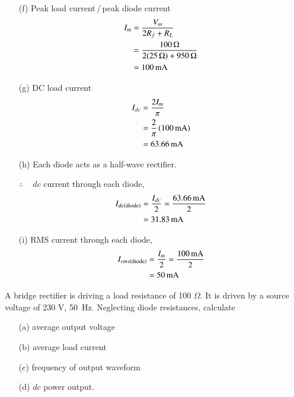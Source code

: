 \begin{solution}
\begin{itemize}
\item[(f)] Peak load current\,/\,peak diode current
\begin{align*}
I_m & = \frac{V_m}{2 R_f + R_L}\\
& = \frac{100\,\Omega}{2(25\,\Omega) + 950\,\Omega }\\
& = 100 \operatorname{mA}
\end{align*}

\item[(g)] DC load current
\begin{align*}
I_{dc} & = \frac{2I_m}{\pi}\\
& = \frac{2}{\pi}\, (100 \operatorname{mA})\\
& = 63.66 \operatorname{mA}
\end{align*}

\item[(h)] Each diode acts as a half-wave rectifier.

$\therefore$ ~ $dc$ current through each diode,
\begin{align*}
I_{dc (\text{diode})} & = \frac{I_{dc}}{2} = \frac{63.66 \operatorname{mA}}{2}\\
& = 31.83 \operatorname{mA}
\end{align*}

\item[(i)] RMS current through each diode, 
\begin{align*}
I_{rms (\text{diode})} & = \frac{I_m}{2} = \frac{100\operatorname{mA}}{2}\\
& = 50 \operatorname{mA}
\end{align*}
\end{itemize}
\vskip -1cm
\end{solution}

\begin{example}\label{exam2.13}
A bridge rectifier is driving a load resistance of 100 $\Omega$. It is
driven by a source voltage of 230 V, 50~Hz. Neglecting diode
resistances, calculate
\begin{itemize}
\item[(a)] average output voltage

\item[(b)] average load current

\item[(c)] frequency of output waveform

\item[(d)] $dc$ power output.
\end{itemize}
\end{example}

